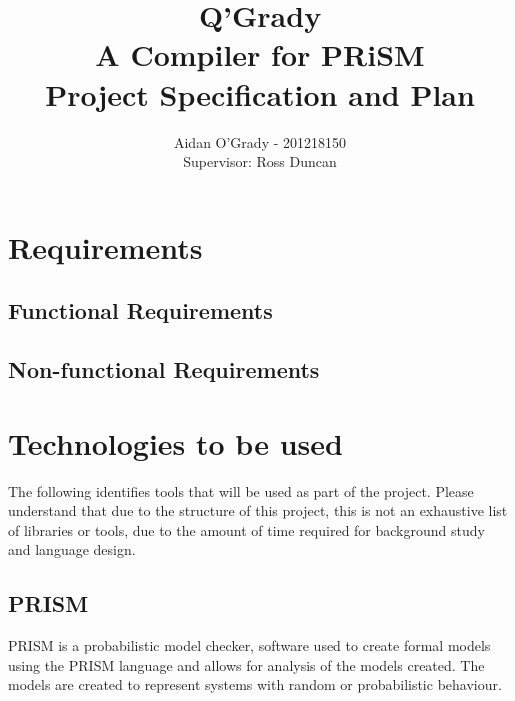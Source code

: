 \documentclass[11pt, a4paper]{article}
\begin{document}
\title{Q'Grady \\A Compiler for PRiSM \\
\large{Project Specification and Plan}}
\author{Aidan O'Grady - 201218150\\Supervisor: Ross Duncan}
\date{}
\maketitle

\section{Requirements} %
\label{sec:requirements}

\subsection{Functional Requirements} %
\label{sub:functional_requirements}


\subsection{Non-functional Requirements} %
\label{sub:non_functional_requirements}


\newpage
\section{Technologies to be used} %
\label{sec:technologies_to_be_used}

The following identifies tools that will be used as part of the project. 
Please understand that due to the structure of this project, this is not an
exhaustive list of libraries or tools, due to the amount of time required for
background study and language design.


\subsection{PRISM}
\label{sub:prism}
PRISM is a probabilistic model checker, software used to create formal models
using the PRISM language and allows for analysis of the models created. The
models are created to represent systems with random or probabilistic behaviour.
\end{document}
